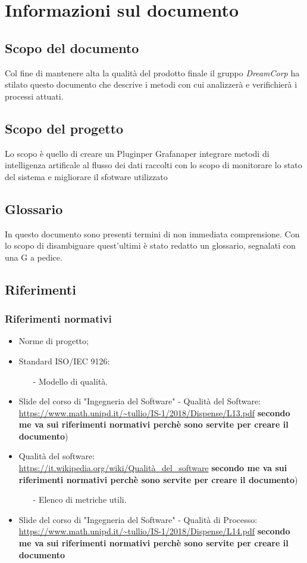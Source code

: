 \section{Informazioni sul documento}
\subsection{Scopo del documento}
 Col fine di mantenere alta la qualità del prodotto finale il gruppo \textit{DreamCorp} ha stilato questo documento che descrive i metodi con cui analizzerà e verifichierà i processi attuati.
 \subsection{Scopo del progetto}
 Lo scopo è quello di creare un Plugin\pedice per Grafana\pedice per integrare metodi di intelligenza artificale al flusso dei dati raccolti con lo scopo di monitorare lo stato del sistema e migliorare il sfotware utilizzato
 \subsection{Glossario}
 In questo documento sono presenti termini di non immediata comprensione. Con lo scopo di disambiguare quest'ultimi è stato redatto un glossario, segnalati con una G a pedice.

 \newpage
 \subsection{Riferimenti}
 \subsubsection{Riferimenti normativi}
 \begin{itemize}
 	\item Norme di progetto;
 	\item Standard ISO/IEC 9126:
 		\begin{itemize}
 			\item[-] Modello di qualità.
 		\end{itemize}
	\item Slide del corso di "Ingegneria del Software" - Qualità del Software: \\
		\url{https://www.math.unipd.it/~tullio/IS-1/2018/Dispense/L13.pdf} \textbf{secondo me va sui riferimenti normativi perchè sono servite per creare il documento})
	\item Qualità del software: \\
		\url{https://it.wikipedia.org/wiki/Qualità_del_software} \textbf{secondo me va sui riferimenti normativi perchè sono servite per creare il documento})
		\begin{itemize}
			\item[-] Elenco di metriche utili.
		\end{itemize} 
	\item  Slide del corso di "Ingegneria del Software" - Qualità di Processo: \\
		\url {https://www.math.unipd.it/~tullio/IS-1/2018/Dispense/L14.pdf}  \textbf{secondo me va sui riferimenti normativi perchè sono servite per creare il documento}
 \end{itemize}
